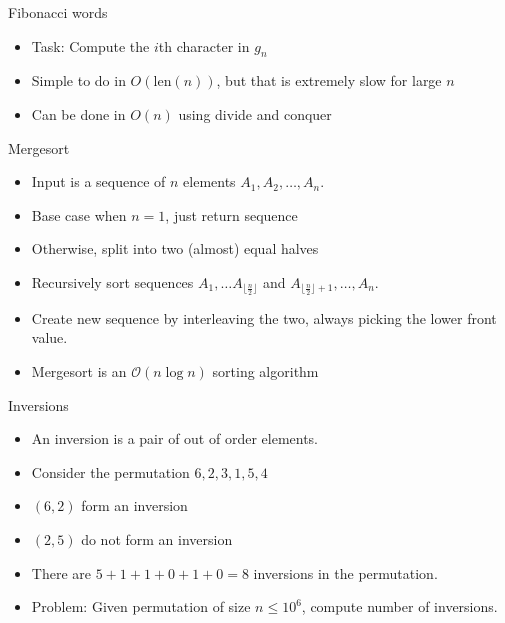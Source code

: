 \documentclass{beamer}
\begin{document}
\begin{frame}[plain]{Fibonacci words}
    \begin{itemize}
        \item Task: Compute the $i$th character in $g_{n}$
        \vspace{10pt}
        \item<2-> Simple to do in $O(\mathrm{len}(n))$, but that is extremely slow for large $n$
        \vspace{10pt}
        \item<3-> Can be done in $O(n)$ using divide and conquer
    \end{itemize}
\end{frame}

\begin{frame}[plain]{Mergesort}
    \begin{itemize}
        \item Input is a sequence of $n$ elements $A_1, A_2, \dotsc, A_n$.
        \item Base case when $n=1$, just return sequence
        \item Otherwise, split into two (almost) equal halves
        \item Recursively sort sequences $A_1, \dotsc A_{\lfloor\frac{n}{2}\rfloor}$ and $A_{\lfloor\frac{n}{2}\rfloor + 1}, \dotsc, A_{n}$.
        \item Create new sequence by interleaving the two, always picking the lower front value.
        \item Mergesort is an $\mathcal{O}(n \log n)$ sorting algorithm
    \end{itemize}
\end{frame}

\begin{frame}[plain]{Inversions}
    \begin{itemize}
        \item An inversion is a pair of out of order elements.
        \item Consider the permutation $6, 2, 3, 1, 5, 4$
        \item $(6, 2)$ form an inversion
        \item $(2, 5)$ do not form an inversion
        \item There are $5 + 1 + 1 + 0 + 1 + 0 = 8$ inversions in the permutation.
        \item Problem: Given permutation of size $n \leq 10^6$, compute number of inversions.
    \end{itemize}
\end{frame}
\end{document}
